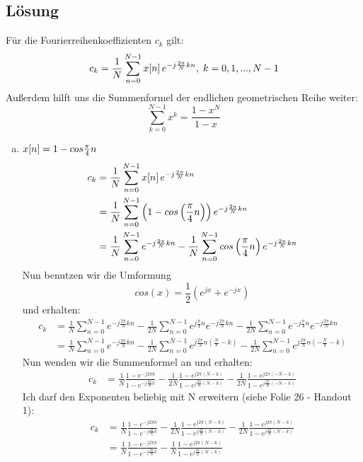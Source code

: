 \subsection*{Lösung}
Für die Fourierreihenkoeffizienten $c_k$ gilt:
\[
	c_k=\frac{1}{N}\sum_{n=0}^{N-1}x\negthinspace\left[n\right]e^{-j\frac{2\pi}{N}kn}, \; k=0,1,...,N-1
\]
Außerdem hilft uns die Summenformel der endlichen geometrischen Reihe weiter:
\[
	\sum_{k=0}^{N-1}x^k=\frac{1-x^N}{1-x}
\]
\begin{enumerate}[a)]
	\item $x\negthinspace\left[n\right]=1-cos\frac{\pi}{4}n$\\
	\begin{align*}
		c_k &= \frac{1}{N}\sum_{n=0}^{N-1}x\negthinspace\left[n\right]e^{-j\frac{2\pi}{N}kn}\\
		&= \frac{1}{N}\sum_{n=0}^{N-1}\left(1-cos\left(\frac{\pi}{4}n\right)\right)e^{-j\frac{2\pi}{N}kn}\\
		&= \frac{1}{N}\sum_{n=0}^{N-1}e^{-j\frac{2\pi}{N}kn}-\frac{1}{N}\sum_{n=0}^{N-1}cos\left(\frac{\pi}{4}n\right)e^{-j\frac{2\pi}{N}kn}
	\end{align*}
	Nun benutzen wir die Umformung
	\[
		cos(x)=\frac{1}{2}\left(e^{jx}+e^{-jx}\right)
	\]
	und erhalten:
	\begin{align*}
		c_k &= \frac{1}{N}\sum_{n=0}^{N-1}e^{-j\frac{2\pi}{N}kn}-\frac{1}{2N}\sum_{n=0}^{N-1}e^{j\frac{\pi}{4}n}e^{-j\frac{2\pi}{N}kn}-\frac{1}{2N}\sum_{n=0}^{N-1}e^{-j\frac{\pi}{4}n}e^{-j\frac{2\pi}{N}kn}\\
		&= \frac{1}{N}\sum_{n=0}^{N-1}e^{-j\frac{2\pi}{N}kn}-
		\frac{1}{2N}\sum_{n=0}^{N-1}e^{j\frac{2\pi}{N}n(\frac{N}{8}-k)}-
		\frac{1}{2N}\sum_{n=0}^{N-1}e^{j\frac{2\pi}{N}n(-\frac{N}{8}-k)}
	\end{align*}
	Nun wenden wir die Summenformel an und erhalten:
	\begin{align*}
		c_k &=
			\frac{1}{N} \frac{1-e^{-j2\pi k}}{1-e^{-j\frac{2\pi}{N}k}} -
			\frac{1}{2N} \frac{1-e^{j2\pi \left(N-k\right)}}{1-e^{j\frac{2\pi}{N} \left(N-k\right)}} -
			\frac{1}{2N} \frac{1-e^{j2\pi \left(-N-k\right)}}{1-e^{j\frac{2\pi}{N} \left(-N-k\right)}}
	\end{align*}
	Ich darf den Exponenten beliebig mit N erweitern (siehe Folie 26 - Handout 1):
	\begin{align*}
		c_k &=
			\frac{1}{N} \frac{1-e^{-j2\pi k}}{1-e^{-j\frac{2\pi}{N}k}} -
			\frac{1}{2N} \frac{1-e^{j2\pi \left(N-k\right)}}{1-e^{j\frac{2\pi}{N} \left(N-k\right)}} -
			\frac{1}{2N} \frac{1-e^{j2\pi \left(N-k\right)}}{1-e^{j\frac{2\pi}{N} \left(N-k\right)}}\\
			&=
			\frac{1}{N} \frac{1-e^{-j2\pi k}}{1-e^{-j\frac{2\pi}{N}k}} -
			\frac{1}{N} \frac{1-e^{j2\pi \left(N-k\right)}}{1-e^{j\frac{2\pi}{N} \left(N-k\right)}}
	\end{align*}
\end{enumerate}